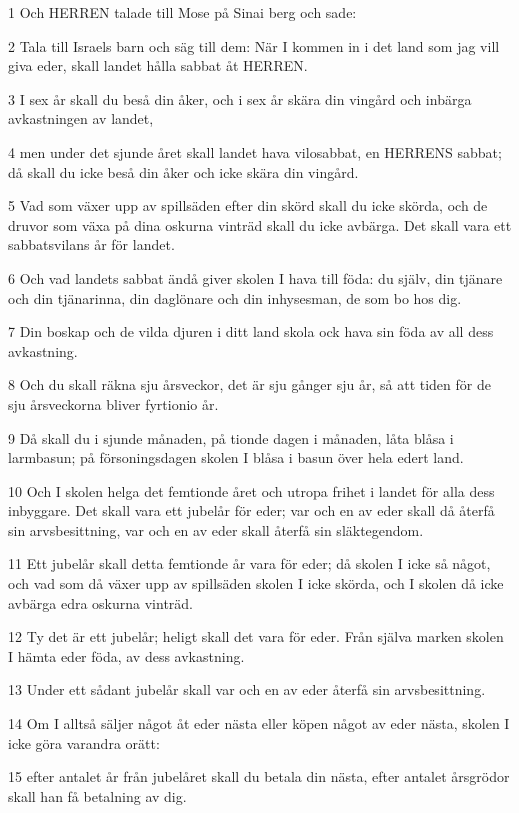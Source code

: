 \par 1 Och HERREN talade till Mose på Sinai berg och sade:
\par 2 Tala till Israels barn och säg till dem: När I kommen in i det land som jag vill giva eder, skall landet hålla sabbat åt HERREN.
\par 3 I sex år skall du beså din åker, och i sex år skära din vingård och inbärga avkastningen av landet,
\par 4 men under det sjunde året skall landet hava vilosabbat, en HERRENS sabbat; då skall du icke beså din åker och icke skära din vingård.
\par 5 Vad som växer upp av spillsäden efter din skörd skall du icke skörda, och de druvor som växa på dina oskurna vinträd skall du icke avbärga. Det skall vara ett sabbatsvilans år för landet.
\par 6 Och vad landets sabbat ändå giver skolen I hava till föda: du själv, din tjänare och din tjänarinna, din daglönare och din inhysesman, de som bo hos dig.
\par 7 Din boskap och de vilda djuren i ditt land skola ock hava sin föda av all dess avkastning.
\par 8 Och du skall räkna sju årsveckor, det är sju gånger sju år, så att tiden för de sju årsveckorna bliver fyrtionio år.
\par 9 Då skall du i sjunde månaden, på tionde dagen i månaden, låta blåsa i larmbasun; på försoningsdagen skolen I blåsa i basun över hela edert land.
\par 10 Och I skolen helga det femtionde året och utropa frihet i landet för alla dess inbyggare. Det skall vara ett jubelår för eder; var och en av eder skall då återfå sin arvsbesittning, var och en av eder skall återfå sin släktegendom.
\par 11 Ett jubelår skall detta femtionde år vara för eder; då skolen I icke så något, och vad som då växer upp av spillsäden skolen I icke skörda, och I skolen då icke avbärga edra oskurna vinträd.
\par 12 Ty det är ett jubelår; heligt skall det vara för eder. Från själva marken skolen I hämta eder föda, av dess avkastning.
\par 13 Under ett sådant jubelår skall var och en av eder återfå sin arvsbesittning.
\par 14 Om I alltså säljer något åt eder nästa eller köpen något av eder nästa, skolen I icke göra varandra orätt:
\par 15 efter antalet år från jubelåret skall du betala din nästa, efter antalet årsgrödor skall han få betalning av dig.
